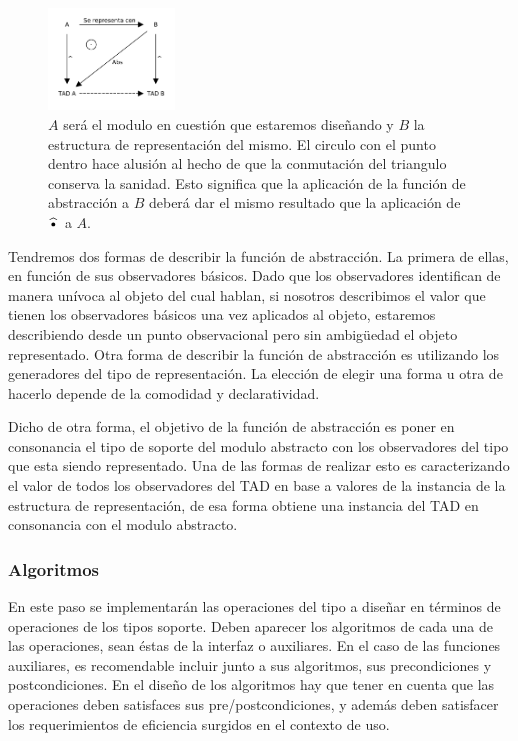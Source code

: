 \begin{figure}
 \centering
 \includegraphics[width=0.3\textwidth]{graficos/FuncionDeAbstraccion.pdf}
 \caption*{\footnotesize $A$ ser\'a el modulo en cuesti\'on que estaremos dise\~nando y $B$ la estructura de representaci\'on del mismo. El circulo con el punto dentro hace alusi\'on al hecho de que la conmutaci\'on del triangulo conserva la sanidad. Esto significa que la aplicaci\'on de la funci\'on de abstracci\'on a $B$ deber\'a dar el mismo resultado que la aplicaci\'on de $\widehat{\text{\textbullet}}$ a $A$.
 \newline 
 \newline }
\end{figure}

Tendremos dos formas de describir la funci\'on de abstracci\'on. La primera de ellas, en funci\'on de sus observadores b\'asicos. Dado que los observadores identifican de manera un\'ivoca al objeto del cual hablan, si nosotros describimos el valor que tienen los observadores b\'asicos una vez aplicados al objeto, estaremos describiendo desde un punto observacional pero sin ambig\"uedad el objeto representado. Otra forma de describir la funci\'on de abstracci\'on es utilizando los generadores del tipo de representaci\'on. La elecci\'on de elegir una forma u otra de hacerlo depende de la comodidad y declaratividad.

Dicho de otra forma, el objetivo de la funci\'on de abstracci\'on es poner en consonancia el tipo de soporte del modulo abstracto con los observadores del tipo que esta siendo representado. Una de las formas de realizar esto es caracterizando el valor de todos los observadores del TAD en base a valores de la instancia de la estructura de representaci\'on, de esa forma obtiene una instancia del TAD en consonancia con el modulo abstracto.

\subsubsection{Algoritmos}

En este paso se implementar\'an las operaciones del tipo a dise\~nar en t\'erminos de operaciones de los tipos soporte. Deben aparecer los algoritmos de cada una de las operaciones, sean \'estas de la interfaz o auxiliares. En el caso de las funciones auxiliares, es recomendable incluir junto a sus algoritmos, sus precondiciones y postcondiciones. En el dise\~no de los algoritmos hay que tener en cuenta que las operaciones deben satisfaces sus pre/postcondiciones, y adem\'as deben satisfacer los requerimientos de eficiencia surgidos en el contexto de uso.

